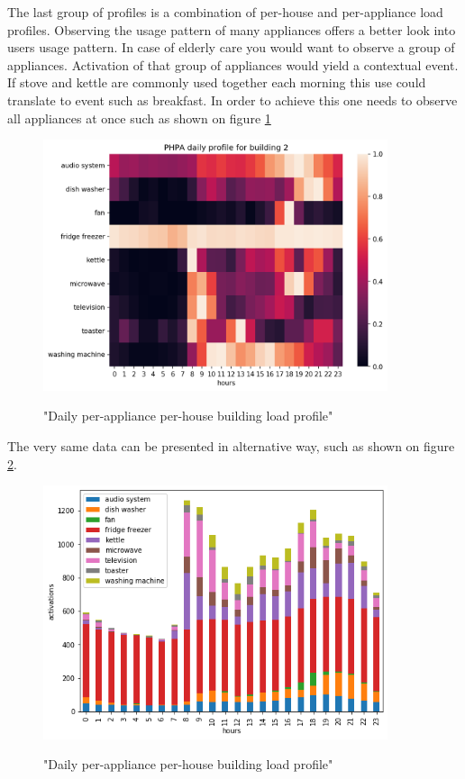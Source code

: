 The last group of profiles is a combination of per-house and per-appliance load profiles.
Observing the usage pattern of many appliances offers a better look into users usage pattern.
In case of elderly care you would want to observe a group of appliances. Activation of that
group of appliances would yield a contextual event. If stove and kettle are commonly used
together each morning this use could translate to event such as breakfast. 
In order to achieve this one needs to observe all appliances at once such as shown on
figure \ref{fig:PHPA}

\begin{figure}[H]
	\centering
	\caption{"Daily per-appliance per-house building load profile"}
	\includegraphics[width=0.9\textwidth]{../Figures/LPS/PHPA.png}
	\label{fig:PHPA}
\end{figure}

The very same data can be presented in alternative way, such as shown on figure \ref{fig:stack}.

\begin{figure}[H]
	\centering
	\caption{"Daily per-appliance per-house building load profile"}
	\includegraphics[width=0.9\textwidth]{../Figures/LPS/stack.png}
	\label{fig:stack}
\end{figure}

